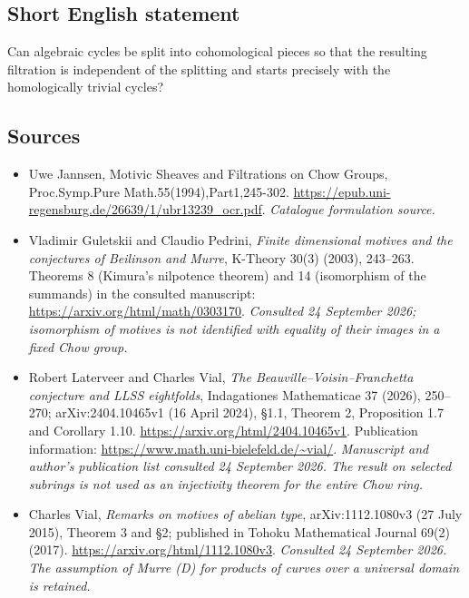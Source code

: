 \documentclass[11pt]{article}
\begin{document}
\subsection{Short English statement}
Can algebraic cycles be split into cohomological pieces so that the resulting filtration is independent of the splitting and starts precisely with the homologically trivial cycles?
\subsection{Sources}
\begin{itemize}\raggedright
\item[\textnormal{[S1]}]\hypertarget{source:30006755:1}{} Uwe Jannsen, Motivic Sheaves and Filtrations on Chow Groups, Proc.Symp.Pure Math.55(1994),Part1,245-302.
\url{https://epub.uni-regensburg.de/26639/1/ubr13239_ocr.pdf}.
{\small\textit{Catalogue formulation source.}}
\item[\textnormal{[E1]}]\hypertarget{extra:30006755:1}{} Vladimir Guletskii and
Claudio Pedrini, \emph{Finite dimensional motives and the conjectures of
Beilinson and Murre}, K-Theory 30(3) (2003), 243--263.
Theorems 8 (Kimura's nilpotence theorem) and 14 (isomorphism of the summands)
in the consulted manuscript:
\url{https://arxiv.org/html/math/0303170}.
{\small\textit{Consulted 24 September 2026; isomorphism of motives is not
identified with equality of their images in a fixed Chow group.}}
\item[\textnormal{[E2]}]\hypertarget{extra:30006755:2}{} Robert Laterveer and Charles
Vial, \emph{The Beauville--Voisin--Franchetta conjecture and LLSS eightfolds},
Indagationes Mathematicae 37 (2026), 250--270;
arXiv:2404.10465v1 (16 April 2024), \S1.1, Theorem 2, Proposition 1.7 and
Corollary 1.10.
\url{https://arxiv.org/html/2404.10465v1}.
Publication information:
\url{https://www.math.uni-bielefeld.de/~vial/}.
{\small\textit{Manuscript and author's publication list consulted
24 September 2026. The result on selected subrings is not used as an
injectivity theorem for the entire Chow ring.}}
\item[\textnormal{[E3]}]\hypertarget{extra:30006755:3}{} Charles Vial,
\emph{Remarks on motives of abelian type}, arXiv:1112.1080v3
(27 July 2015), Theorem 3 and \S2; published in Tohoku Mathematical Journal
69(2) (2017).
\url{https://arxiv.org/html/1112.1080v3}.
{\small\textit{Consulted 24 September 2026. The assumption of Murre (D)
for products of curves over a universal domain is retained.}}
\end{itemize}
\end{document}
